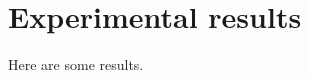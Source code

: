 \documentclass[10pt,twocolumn,letterpaper]{article}
\begin{document}
%
%
%
%
%
%
%
%
%

\section{Experimental results}
Here are some results.
\end{document}
